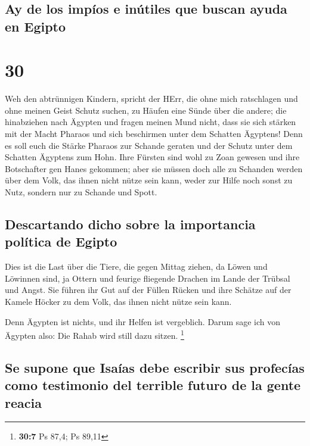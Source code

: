 \hypertarget{ay-de-los-impuxedos-e-inuxfatiles-que-buscan-ayuda-en-egipto}{%
\subsection{Ay de los impíos e inútiles que buscan ayuda en
Egipto}\label{ay-de-los-impuxedos-e-inuxfatiles-que-buscan-ayuda-en-egipto}}

\hypertarget{section-29}{%
\section{30}\label{section-29}}

 Weh den abtrünnigen Kindern, spricht der HErr, die ohne
mich ratschlagen und ohne meinen Geist Schutz suchen, zu Häufen eine
Sünde über die andere;  die hinabziehen nach Ägypten und
fragen meinen Mund nicht, dass sie sich stärken mit der Macht Pharaos
und sich beschirmen unter dem Schatten Ägyptens!  Denn es
soll euch die Stärke Pharaos zur Schande geraten und der Schutz unter
dem Schatten Ägyptens zum Hohn.  Ihre Fürsten sind wohl zu
Zoan gewesen und ihre Botschafter gen Hanes gekommen; 
aber sie müssen doch alle zu Schanden werden über dem Volk, das ihnen
nicht nütze sein kann, weder zur Hilfe noch sonst zu Nutz, sondern nur
zu Schande und Spott.

\hypertarget{descartando-dicho-sobre-la-importancia-poluxedtica-de-egipto}{%
\subsection{Descartando dicho sobre la importancia política de
Egipto}\label{descartando-dicho-sobre-la-importancia-poluxedtica-de-egipto}}

 Dies ist die Last über die Tiere, die gegen Mittag
ziehen, da Löwen und Löwinnen sind, ja Ottern und feurige fliegende
Drachen im Lande der Trübsal und Angst. Sie führen ihr Gut auf der
Füllen Rücken und ihre Schätze auf der Kamele Höcker zu dem Volk, das
ihnen nicht nütze sein kann.

 Denn Ägypten ist nichts, und ihr Helfen ist vergeblich.
Darum sage ich von Ägypten also: Die Rahab wird still dazu sitzen.
\footnote{\textbf{30:7} Ps 87,4; Ps 89,11}

\hypertarget{se-supone-que-isauxedas-debe-escribir-sus-profecuxedas-como-testimonio-del-terrible-futuro-de-la-gente-reacia}{%
\subsection{Se supone que Isaías debe escribir sus profecías como
testimonio del terrible futuro de la gente
reacia}\label{se-supone-que-isauxedas-debe-escribir-sus-profecuxedas-como-testimonio-del-terrible-futuro-de-la-gente-reacia}}

